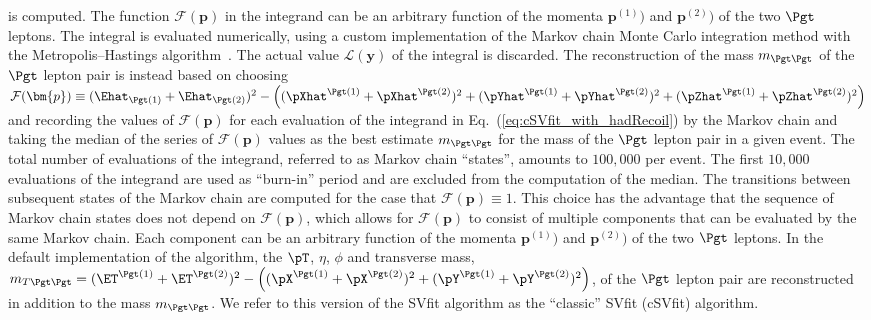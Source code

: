is computed.
The function $\mathcal{F}(\bm{p})$ in the integrand can be an arbitrary function of the momenta $\bm{p}^{(1)})$ and $\bm{p}^{(2)})$ of the two $\Pgt$ leptons.
The integral is evaluated numerically, using a custom implementation of the Markov chain Monte Carlo integration method with the Metropolis--Hastings algorithm~\cite{Metropolis_Hastings}.
The actual value $\mathcal{L}(\bm{y})$ of the integral is discarded.
The reconstruction of the mass $m_{\Pgt\Pgt}$ of the $\Pgt$ lepton pair is instead based on choosing 
$\mathcal{F}(\bm{p}) \equiv (\Ehat_{\Pgt(1)} + \Ehat_{\Pgt(2)})^{2} 
 - \left( (\pXhat^{\Pgt(1)} + \pXhat^{\Pgt(2)})^{2} + (\pYhat^{\Pgt(1)} + \pYhat^{\Pgt(2)})^{2} + (\pZhat^{\Pgt(1)} + \pZhat^{\Pgt(2)})^{2} \right)$
and recording the values of $\mathcal{F}(\bm{p})$ for each evaluation of the integrand in Eq.~(\ref{eq:cSVfit_with_hadRecoil}) by the Markov chain
and taking the median of the series of $\mathcal{F}(\bm{p})$ values
as the best estimate $m_{\Pgt\Pgt}$ for the mass of the $\Pgt$ lepton pair in a given event.
The total number of evaluations of the integrand, referred to as Markov chain ``states'',  
amounts to $100,000$ per event. The first $10,000$ evaluations of the integrand are used as ``burn-in'' period and are excluded from the computation of the median.
The transitions between subsequent states of the Markov chain are computed for the case that $\mathcal{F}(\bm{p}) \equiv 1$.
This choice has the advantage that the sequence of Markov chain states does not depend on $\mathcal{F}(\bm{p})$,
which allows for $\mathcal{F}(\bm{p})$ to consist of multiple components that can be evaluated by the same Markov chain.
Each component can be an arbitrary function of the momenta $\bm{p}^{(1)})$ and $\bm{p}^{(2)})$ of the two $\Pgt$ leptons.
In the default implementation of the algorithm,
the $\pT$, $\eta$, $\phi$ and transverse mass, $m_{T\Pgt\Pgt} = (\ET^{\Pgt(1)} + \ET^{\Pgt(2)})^{2} 
 - \left( (\pX^{\Pgt(1)} + \pX^{\Pgt(2)})^{2} + (\pY^{\Pgt(1)} + \pY^{\Pgt(2)})^{2} \right)$, of the $\Pgt$ lepton pair
are reconstructed in addition to the mass $m_{\Pgt\Pgt}$.
We refer to this version of the SVfit algorithm as the ``classic'' SVfit (cSVfit) algorithm.

